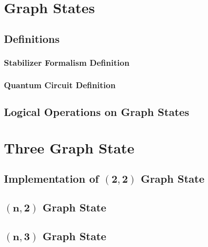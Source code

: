 \documentclass[12pt,a4paper]{report}
\begin{document}





\begingroup
    \hypersetup{linkcolor=black}
    \renewcommand\contentsname{\bfseries Contents}
    \tableofcontents
\endgroup








\chapter{Graph States}

\section{Definitions}

\subsection{Stabilizer Formalism Definition}

\subsection{Quantum Circuit Definition}

\section{Logical Operations on Graph States}

\chapter{Three Graph State}

\section{\texorpdfstring{Implementation of $\mathbf{(2, 2)}$ Graph State}{Implementation of (2, 2) Graph State}}

\section{\texorpdfstring{$\mathbf{(n, 2)}$ Graph State}{(n, 2) Graph State}}

\section{\texorpdfstring{$\mathbf{(n, 3)}$ Graph State}{(n, 3) Graph State}}


\printbibliography[heading=bibintoc]
\end{document}
